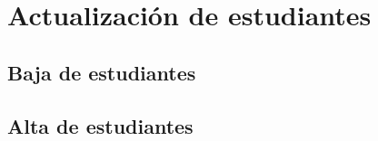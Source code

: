 \section{Actualización de estudiantes}
\subsection{Baja de estudiantes}
\subsection{Alta de estudiantes}